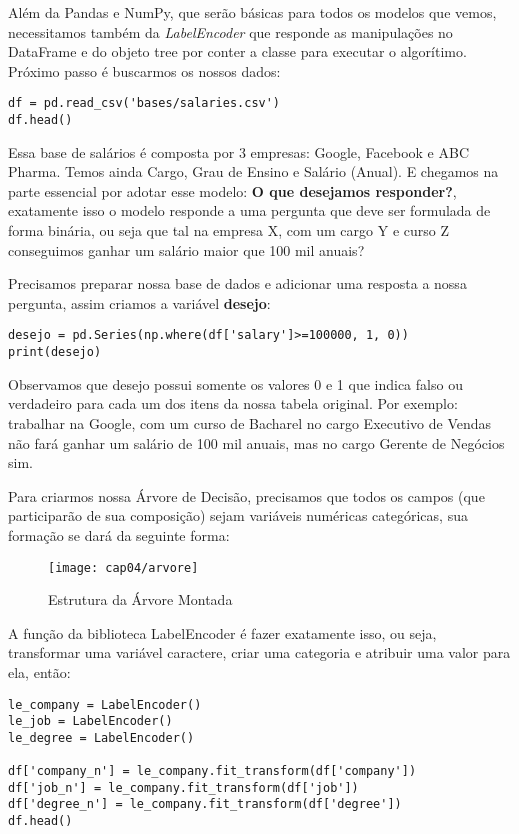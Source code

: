 Além da Pandas e NumPy, que serão básicas para todos os modelos que vemos, necessitamos também da \textit{LabelEncoder} que responde as manipulações no DataFrame e do objeto tree por conter a classe para executar o algorítimo. Próximo passo é buscarmos os nossos dados:
\begin{lstlisting}[]
df = pd.read_csv('bases/salaries.csv')
df.head()
\end{lstlisting}

Essa base de salários é composta por 3 empresas: Google, Facebook e ABC Pharma. Temos ainda Cargo, Grau de Ensino e Salário (Anual). E chegamos na parte essencial por adotar esse modelo: \textbf{O que desejamos responder?}, exatamente isso o modelo responde a uma pergunta que deve ser formulada de forma binária, ou seja que tal na empresa X, com um cargo Y e curso Z conseguimos ganhar um salário maior que 100 mil anuais?

Precisamos preparar nossa base de dados e adicionar uma resposta a nossa pergunta, assim criamos a variável \textbf{desejo}:
\begin{lstlisting}[]
desejo = pd.Series(np.where(df['salary']>=100000, 1, 0))
print(desejo)
\end{lstlisting}

Observamos que desejo possui somente os valores 0 e 1 que indica falso ou verdadeiro para cada um dos itens da nossa tabela original. Por exemplo: trabalhar na Google, com um curso de Bacharel no cargo Executivo de Vendas não fará ganhar um salário de 100 mil anuais, mas no cargo Gerente de Negócios sim.

Para criarmos nossa Árvore de Decisão, precisamos que todos os campos (que participarão de sua composição) sejam variáveis numéricas categóricas, sua formação se dará da seguinte forma:
\begin{figure}[H]
	\centering
	\texttt{[image: cap04/arvore]}
	\caption{Estrutura da Árvore Montada}
\end{figure}

A função da biblioteca LabelEncoder é fazer exatamente isso, ou seja, transformar uma variável caractere, criar uma categoria e atribuir uma valor para ela, então:
\begin{lstlisting}[]
le_company = LabelEncoder()
le_job = LabelEncoder()
le_degree = LabelEncoder()

df['company_n'] = le_company.fit_transform(df['company'])
df['job_n'] = le_company.fit_transform(df['job'])
df['degree_n'] = le_company.fit_transform(df['degree'])
df.head()
\end{lstlisting}

